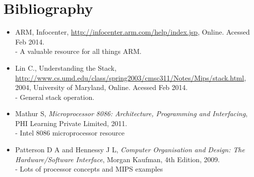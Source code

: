 \documentclass[12pt,a4paper]{article}
\begin{document}
\newpage




\makeatletter 
	\renewcommand\@biblabel[1]{\textbullet}
\makeatother

\section*{Bibliography}

\begin{itemize}
   \item{
      ARM, 
      Infocenter,
      \url{http://infocenter.arm.com/help/index.jsp},
      Online. Acessed Feb 2014.\\
      - A valuable resource for all things ARM.
   }
   \item{
      Lin C.,
      Understanding the Stack,
      \url{http://www.cs.umd.edu/class/spring2003/cmsc311/Notes/Mips/stack.html},
      2004,
      University of Maryland,
      Online. Acessed Feb 2014.\\
      - General stack operation.

   }
   \item{
      Mathur S,
      \emph{Microprocessor 8086: Architecture, Programming and Interfacing},
      PHI Learning Private Limited,
      2011.\\
      - Intel 8086 microprocessor resource
   }
   \item{
      Patterson D A and Hennessy J L,
      \emph{Computer Organisation and Design: The Hardware/Software Interface},
      Morgan Kaufman,
      4th Edition,
      2009.\\
      - Lots of processor concepts and MIPS examples
   }
\end{itemize}

%
%
%
%
%
%
\end{document}
